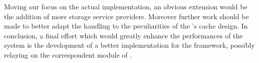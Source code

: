 Moving our focus on the actual implementation, an obvious extension
would be the addition of more \cloud storage service
providers. Moreover further work should be made to better adapt the
\cloud \descriptors handling to the peculiarities of the \grapes's
cache design. In conclusion, a final effort which would greatly enhance
the performances of the system is the development of a better \networkhelper
implementation for the \cloudypeer framework, possibly relaying on the
correspondent module of \grapes.
